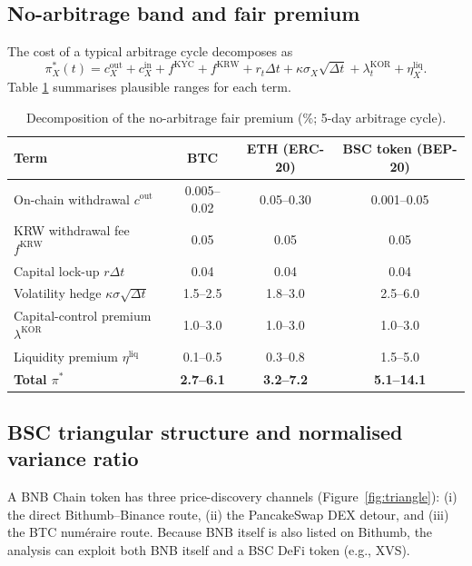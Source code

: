 \documentclass[11pt,a4paper]{article}
\begin{document}
\subsection{No-arbitrage band and fair premium}
The cost of a typical arbitrage cycle decomposes as
\begin{equation}
\pi^*_X(t) = c_X^{\text{out}}+c_X^{\text{in}} + f^{\text{KYC}}+f^{\text{KRW}}
           + r_t\Delta t + \kappa\sigma_X\sqrt{\Delta t}
           + \lambda_t^{\text{KOR}} + \eta_X^{\text{liq}}.
\label{eq:fair_premium}
\end{equation}
Table \ref{tab:fair_premium} summarises plausible ranges for each term.

\begin{table}[H]
\centering
\caption{Decomposition of the no-arbitrage fair premium (\%; 5-day arbitrage cycle).}
\label{tab:fair_premium}
\begin{tabular}{lccc}
\toprule
Term & BTC & ETH (ERC-20) & BSC token (BEP-20) \\
\midrule
On-chain withdrawal $c^{\text{out}}$ & 0.005--0.02 & 0.05--0.30 & 0.001--0.05 \\
KRW withdrawal fee $f^{\text{KRW}}$  & 0.05 & 0.05 & 0.05 \\
Capital lock-up $r\Delta t$         & 0.04 & 0.04 & 0.04 \\
Volatility hedge $\kappa\sigma\sqrt{\Delta t}$ & 1.5--2.5 & 1.8--3.0 & 2.5--6.0 \\
Capital-control premium $\lambda^{\text{KOR}}$ & 1.0--3.0 & 1.0--3.0 & 1.0--3.0 \\
Liquidity premium $\eta^{\text{liq}}$ & 0.1--0.5 & 0.3--0.8 & 1.5--5.0 \\
\midrule
\textbf{Total $\pi^*$} & \textbf{2.7--6.1} & \textbf{3.2--7.2} & \textbf{5.1--14.1} \\
\bottomrule
\end{tabular}
\end{table}

\subsection{BSC triangular structure and normalised variance ratio}
A BNB Chain token has three price-discovery channels (Figure~\ref{fig:triangle}):
(i) the direct Bithumb--Binance route, (ii) the PancakeSwap DEX detour, and (iii) the BTC num\'eraire
route. Because BNB itself is also listed on Bithumb, the analysis can exploit both BNB itself and a
BSC DeFi token (e.g., XVS).
\end{document}
